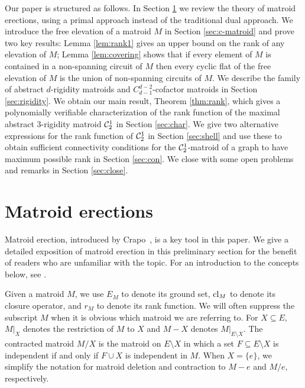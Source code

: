 \documentclass{daj}
\newcommand{\sm}{{\setminus}}
\begin{document}
Our paper is structured as follows. In Section \ref{sec:erections} we review the theory of matroid erections, using a primal approach instead of the traditional dual approach. We introduce the free elevation 
of a matroid $M$ in Section \ref{sec:c-matroid} and prove two key results:  Lemma \ref{lem:rank1} gives an upper bound on the rank of 
any elevation of $M$;
Lemma \ref{lem:covering} shows that if every element of 
$M$ is contained in a non-spanning circuit of $M$ then every cyclic flat
of 
the free elevation of $M$ is the union of non-spanning circuits of $M$. We describe the family of abstract $d$-rigidity matroids and $C_{d-1}^{d-2}$-cofactor matroids in Section \ref{sec:rigidity}. We obtain our main result, Theorem \ref{thm:rank}, which gives a polynomially verifiable characterization of the rank function of the maximal abstract 3-rigidity matroid ${\cal C}_{2}^{1}$ in Section \ref{sec:char}.
We give two alternative expressions for the rank function of ${\cal C}_{2}^{1}$ in Section \ref{sec:shell} and use these to obtain sufficient connectivity conditions for the ${\cal C}_{2}^{1}$-matroid of a graph to have maximum possible rank in Section \ref{sec:con}. We close with some  open problems and remarks in Section \ref{sec:close}.



\section{Matroid erections}\label{sec:erections}
Matroid erection, introduced by Crapo~\cite{C70}, is a key tool in this paper.
We give a detailed exposition of matroid erection in this preliminary section for the benefit of readers who are unfamiliar with the topic. For an introduction to the concepts below, see \cite{O11}.

Given a matroid $M$, we use $E_M$ to denote its ground set, ${\rm cl}_M$ to denote its closure operator, and $r_M$ to denote its rank function. We will often suppress the subscript $M$ when it is obvious which matroid we are referring to.
For $X\subseteq E$, $M|_X$ denotes the restriction of $M$ to $X$ and $M- X$ denotes $M|_{E\sm X}$. The contracted matroid $M/X$ is the matroid on $E\sm X$ in which a set $F\subseteq E\sm X$ is independent if and only if $F\cup X$ is independent in $M$. When $X=\{e\}$, we simplify the notation for matroid deletion and contraction to $M-e$ and $M/e$, respectively.
\end{document}
